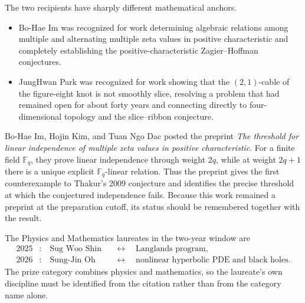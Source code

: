     \begin{fact}
        The two \KAIST{} recipients have sharply different mathematical anchors.
        \begin{itemize}
            \item Bo-Hae Im was recognized for work determining algebraic
                  relations among multiple and alternating multiple zeta values
                  in positive characteristic and completely establishing the
                  positive-characteristic Zagier--Hoffman conjectures.
            \item JungHwan Park was recognized for work showing that the
                  $(2,1)$-cable of the figure-eight knot is not smoothly slice,
                  resolving a problem that had remained open for about forty
                  years and connecting directly to four-dimensional topology and
                  the slice--ribbon conjecture.
        \end{itemize}
    \end{fact}

    \begin{fact}
        Bo-Hae Im, Hojin Kim, and Tuan Ngo Dac posted the preprint
        \textit{The threshold for linear independence of multiple zeta values in
        positive characteristic}. For a finite field $\mathbb{F}_q$, they prove linear
        independence through weight $2q$, while at weight $2q+1$ there is a
        unique explicit $\mathbb{F}_q$-linear relation. Thus the preprint gives the first
        counterexample to Thakur's 2009 conjecture and identifies the precise
        threshold at which the conjectured independence fails. Because this work
        remained a preprint at the preparation cutoff, its status should be
        remembered together with the result.
    \end{fact}

    \begin{fact}
        The Physics and Mathematics laureates in the two-year window are
        \[
            \begin{aligned}
                2025&:\quad \text{Sug Woo Shin}
                &&\longleftrightarrow\quad \text{Langlands program},\\
                2026&:\quad \text{Sung-Jin Oh}
                &&\longleftrightarrow\quad \text{nonlinear hyperbolic PDE and black holes}.
            \end{aligned}
        \]
        The prize category combines physics and mathematics, so the laureate's
        own discipline must be identified from the citation rather than from the
        category name alone.
    \end{fact}

